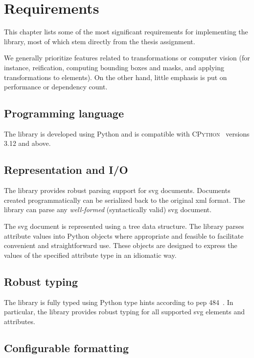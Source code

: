 \chapter{Requirements}\label{chap:requirements}

This chapter lists some of the most significant requirements for implementing the library, most of which stem directly from the thesis assignment.

We generally prioritize features related to transformations or computer vision (for instance, reification, computing bounding boxes and masks, and applying transformations to elements). On the other hand, little emphasis is put on performance or dependency count.

\section{Programming language}

The library is developed using Python and is compatible with \textsc{CPython}~\cite{python-downloads} versions 3.12 and above.

\section{Representation and I/O}

The library provides robust parsing support for \gls{svg} documents. Documents created programmatically can be serialized back to the original \gls{xml} format. The library can parse any \emph{well-formed} (syntactically valid) \gls{svg} document.

The \gls{svg} document is represented using a tree data structure. The library parses attribute values into Python objects where appropriate and feasible to facilitate convenient and straightforward use. These objects are designed to express the values of the specified attribute type in an idiomatic way.

\section{Robust typing}

The library is fully typed using Python type hints according to \gls{pep} 484~\cite{pep484typehints}. In particular, the library provides robust typing for all supported \gls{svg} elements and attributes.

\section{Configurable formatting}

